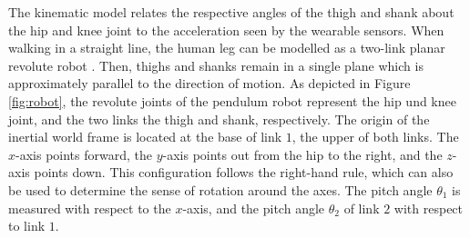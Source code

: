 The kinematic model relates the respective angles of the thigh and shank about the hip and knee joint to the acceleration seen by the wearable sensors. When walking in a straight line, the human leg can be modelled as a two-link planar revolute robot \cite{bennett_motion_2014}. Then, thighs and shanks remain in a single plane which is approximately parallel to the direction of motion. As depicted in Figure \ref{fig:robot}, the revolute joints of the pendulum robot represent the hip und knee joint, and the two links the thigh and shank, respectively. The origin of the inertial world frame is located at the base of link $1$, the upper of both links. The $x$-axis points forward, the $y$-axis points out from the hip to the right, and the $z$-axis points down. This configuration follows the right-hand rule, which can also be used to determine the sense of rotation around the axes. The pitch angle $\theta_1$ is measured with respect to the $x$-axis, and the pitch angle $\theta_2$ of link $2$ with respect to link $1$. 

